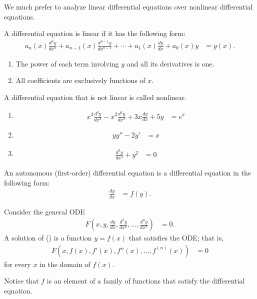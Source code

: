 \documentclass[10pt]{mypackage}
\begin{document}
  \begin{definition}
    We much prefer to analyze linear differential equations over nonlinear differential equations.\newline

    A differential equation is linear if it has the following form:
    \begin{align*}
      a_n(x)\frac{d^ny}{dx^n} + a_{n-1}(x)\frac{d^{n-1}y}{dx^{n-1}} + \cdots + a_{1}(x)\frac{dy}{dx} + a_0(x)y &= g(x).
    \end{align*}
    \begin{enumerate}[(1)]
      \item The power of each term involving $y$ and all its derivatives is one.
      \item All coefficients are exclusively functions of $x$.
    \end{enumerate}
    A differential equation that is not linear is called nonlinear.
  \end{definition}
  \begin{example}\hfill
    \begin{enumerate}[(1)]
      \item 
        \begin{align*}
          x^3\frac{d^3y}{dx^3} - x^2\frac{d^2y}{dx^2} + 3x\frac{dy}{dx} + 5y &= e^x \tag*{Linear}
        \end{align*}
      \item 
        \begin{align*}
          yy'' - 2y' &= x\tag*{Nonlinear}
        \end{align*}
      \item 
        \begin{align*}
          \frac{d^3y}{dx^3} + y^2 &= 0 \tag*{Nonlinear}
        \end{align*}
    \end{enumerate}
  \end{example}
  \begin{definition}
    An autonomous (first-order) differential equation is a differential equation in the following form:
    \begin{align*}
      \frac{dy}{dx} &= f(y).
    \end{align*}
  \end{definition}
  \begin{definition}
    Consider the general ODE
    \begin{align*}
      F\left(x,y,\frac{dy}{dx},\frac{d^2y}{dx^2},\dots,\frac{d^ny}{dx^n}\right) &= 0.\tag*{(\textasteriskcentered)}
    \end{align*}
    A solution of (\textasteriskcentered) is a function $y = f(x)$ that satisfies the ODE; that is,
    \begin{align*}
      F\left(x,f(x),f'(x),f''(x),\dots,f^{(n)}(x)\right) &= 0
    \end{align*}
    for every $x$ in the domain of $f(x)$.\newline

    Notice that $f$ is an element of a family of functions that satisfy the differential equation.
  \end{definition}
\end{document}
